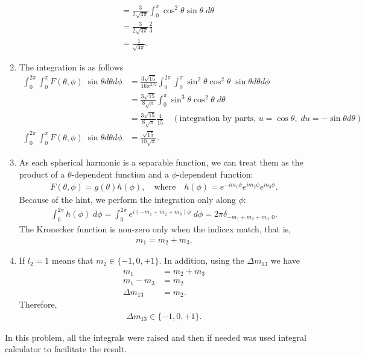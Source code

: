 \documentclass[letterpaper,11pt,twoside]{article}
\begin{document}
\begin{enumerate}[itemsep=0pt,topsep=0pt,label=\alph*)]
\begin{align*}
    &=\frac{3}{2\sqrt{4\pi}}\int_0^\pi\cos^2\theta\sin\theta\;d\theta\\
    &=\frac{3}{2\sqrt{4\pi}}\frac{2}{3}\\
    &=\frac{1}{\sqrt{4\pi}}.
  \end{align*}
  \item The integration is as follows
  \begin{align*}
    \int_0^{2\pi}\int_0^\pi F(\theta,\phi)\;\sin\theta d\theta d\phi&=\frac{3\sqrt{15}}{16\pi^{3/2}}\int_0^{2\pi}\int_0^\pi\sin^2\theta\cos^2\theta\;\sin\theta d\theta d\phi\\
    &=\frac{3\sqrt{15}}{8\sqrt{\pi}}\int_0^\pi\sin^3\theta\cos^2\theta\;d\theta\\
    &=\frac{3\sqrt{15}}{8\sqrt{\pi}}\frac{4}{15}\quad(\text{integration by parts, }u=\cos\theta,\;du=-\sin\theta d\theta)\\
    \int_0^{2\pi}\int_0^\pi F(\theta,\phi)\;\sin\theta d\theta d\phi&=\frac{\sqrt{15}}{10\sqrt{\pi}}.
  \end{align*}
  \item As each spherical harmonic is a separable function, we can treat them as the product of a $\theta$-dependent function and a $\phi$-dependent function:
  \begin{align*}
    F(\theta,\phi)=g(\theta)h(\phi),\quad\text{where}\quad h(\phi)=e^{-im_1\phi}e^{im_2\phi}e^{m_3\phi}.
  \end{align*}
  Because of the hint, we perform the integration only along $\phi$:
  \begin{align*}
    \int_0^{2\pi}h(\phi)\;d\phi=\int_0^{2\pi}e^{i(-m_1+m_2+m_3)\phi}\;d\phi=2\pi\delta_{-m_1+m_2+m_3,0}.
  \end{align*}
  The Kronecker function is non-zero only when the indicex match, that is,
  \begin{align*}
    m_1=m_2+m_3.
  \end{align*}
  \item If $l_2=1$ means that $m_2\in\{-1,0,+1\}$. In addition, using the $\Delta m_{13}$ we have 
  \begin{align*}
    m_1&=m_2+m_3\\
    m_1-m_3&=m_2\\
    \Delta m_{13}&=m_2.
  \end{align*}
  Therefore, 
  \begin{align*}
    \Delta m_{13}\in\{-1,0,+1\}.
  \end{align*}
\end{enumerate}
In this problem, all the integrals were raised and then if needed was used integral calculator to facilitate the result.
\end{document}
